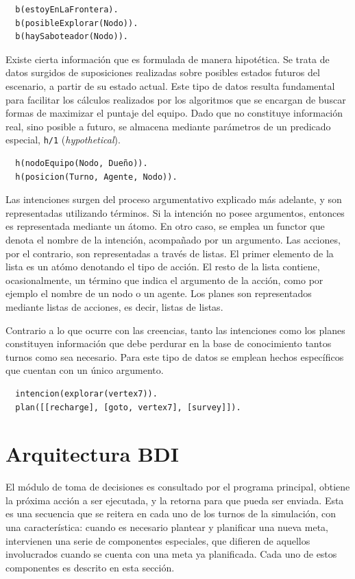 \begin{verbatim}
  b(estoyEnLaFrontera).
  b(posibleExplorar(Nodo)).
  b(haySaboteador(Nodo)).
\end{verbatim}

Existe cierta información que es formulada de manera hipotética.
Se trata de datos surgidos de suposiciones realizadas sobre posibles
estados futuros del escenario, a partir de su estado actual.
Este tipo de datos resulta fundamental para facilitar los cálculos
realizados por los algoritmos que se encargan de buscar formas de
maximizar el puntaje del equipo.
Dado que no constituye información real, sino posible a futuro, se
almacena mediante parámetros de un predicado especial, \texttt{h/1}
(\textit{hypothetical}).

\begin{verbatim}
  h(nodoEquipo(Nodo, Dueño)).
  h(posicion(Turno, Agente, Nodo)). 
\end{verbatim}

Las intenciones surgen del proceso argumentativo explicado más
adelante, y son representadas utilizando términos.
Si la intención no posee argumentos, entonces es representada mediante
un átomo.
En otro caso, se emplea un functor que denota el nombre de la
intención, acompañado por un argumento.
Las acciones, por el contrario, son representadas a través de listas.
El primer elemento de la lista es un atómo denotando el tipo de
acción.
El resto de la lista contiene, ocasionalmente, un término que indica
el argumento de la acción, como por ejemplo el nombre de un nodo o un
agente.
Los planes son representados mediante listas de acciones, es decir,
listas de listas.

Contrario a lo que ocurre con las creencias, tanto las intenciones
como los planes constituyen información que debe perdurar en la base
de conocimiento tantos turnos como sea necesario.
Para este tipo de datos se emplean hechos específicos que cuentan con
un único argumento.

\begin{verbatim}
  intencion(explorar(vertex7)).
  plan([[recharge], [goto, vertex7], [survey]]).
\end{verbatim}

\section{Arquitectura BDI} 
\label{sec:arquitectura_bdi}

El módulo de toma de decisiones es consultado por el programa
principal, obtiene la próxima acción a ser ejecutada, y la retorna
para que pueda ser enviada.
Esta es una secuencia que se reitera en cada uno de los turnos de la
simulación, con una característica: cuando es necesario plantear y
planificar una nueva meta, intervienen una serie de componentes
especiales, que difieren de aquellos involucrados cuando se cuenta con
una meta ya planificada.
Cada uno de estos componentes es descrito en esta sección.

